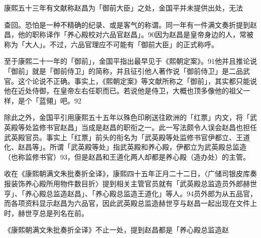 康熙五十三年有文献称赵昌为「御前大臣」之处，金国平并未提供出处，无法

\vfill
\begin{BookNotes}
\end{BookNotes}

\noindent 查回。恐怕是一种不精确的纪录、或是客气的称谓。同一年有一件满文奏折提到赵昌，他的职称译作「养心殿校对六品官赵昌」。90因为赵昌是皇帝身边的人，常被称为「大人」。不过，六品官理应不可能有「御前大臣」的正式称呼。

至于康熙二十一年的「御前」，金国平指出最早见于《熙朝定案》。91他并且推论说「御前」就是「御前侍卫」的简称，并且征引他人著作说「御前侍卫」是二品武官。这个论说不正确。事实上，《熙朝定案》等文献所称之「御前」，其实都只能说他在近处侍御，在皇帝左右任职而已。若说他是侍卫，大概也顶多像他的祖父一样，是个「蓝翎」吧。92

除此之外，金国平引用康熙五十五年以殊色印刷送往欧洲的「红票」内文，将「武英殿等处监修书官赵昌」当成是赵昌的职衔之一。此一写法颇令人误会赵昌也担任武英殿官员。事实上「红票」前头的衔名为「武英殿等处监修书官伊都立、王道化、赵昌等」。所谓「武英殿等处」指武英殿和养心殿，伊都立为武英殿总监造（也称监修书官）93，但是赵昌和王道化两人却都是养心殿（造办处）的主管。

收在《康熙朝满文朱批奏折全译》，康熙四十五年正月二十二日，〈广储司银皮库奏报装饰养心殿所用物件数目折〉提到相关主管官员就有「武英殿总监造员外郎赫世亨」、「养心殿总监造赵昌」、「养心殿总监造王道化」等人。94员外郎为从五品官，而各项资料显示赵昌为六品官，因此武英殿总监造赫世亨与赵昌一起出现在文件上时，赫世亨总是列名在前。

\begin{BookQuote}
《康熙朝满文朱批奏折全译》不止一处，提到赵昌都是「养心殿总监造赵
\end{BookQuote}

